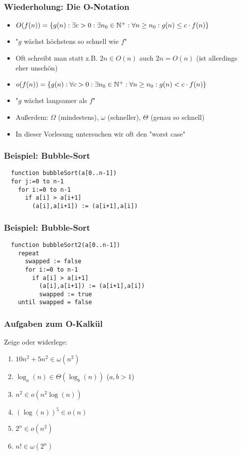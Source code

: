 \begin{frame}
\frametitle{Wiederholung: Die O-Notation}
\begin{itemize}
\item $O(f(n))=\{g(n):\exists c>0: \exists n_0\in\mathbb{N}^+: \forall n\geq n_0: g(n)\leq c\cdot f(n)\}$
\item "$g$ wächst höchstens so schnell wie $f$" \pause
\item Oft schreibt man statt z.B. $2n\in O(n)$ auch $2n=O(n)$ (ist allerdings eher unschön) \pause
\item $o(f(n))=\{g(n):\forall c>0: \exists n_0\in\mathbb{N}^+: \forall n\geq n_0: g(n)< c\cdot f(n)\}$
\item "$g$ wächst langsamer als $f$" \pause
\item Außerdem: $\Omega$ (mindestens), $\omega$ (schneller), $\Theta$ (genau so schnell) \pause
\item In dieser Vorlesung untersuchen wir oft den "worst case"
\end{itemize}
\end{frame}

\begin{frame}[fragile]
\frametitle{Beispiel: Bubble-Sort}
\begin{lstlisting}
  function bubbleSort(a[0..n-1])
  for j:=0 to n-1
    for i:=0 to n-1
      if a[i] > a[i+1]
        (a[i],a[i+1]) := (a[i+1],a[i]) 
\end{lstlisting}%
\end{frame}

\begin{frame}[fragile]
\frametitle{Beispiel: Bubble-Sort}
\begin{lstlisting}
  function bubbleSort2(a[0..n-1])
    repeat
      swapped := false
      for i:=0 to n-1
        if a[i] > a[i+1]
          (a[i],a[i+1]) := (a[i+1],a[i]) 
          swapped := true
    until swapped = false
\end{lstlisting}%
\end{frame}

\begin{frame}
\frametitle{Aufgaben zum O-Kalkül}
Zeige oder widerlege:
\begin{enumerate}
\item $10n^2 + 5n^2 \in \omega(n^2)$
\item $\log_a(n)\in\Theta(\log_b(n))$ ($a,b>1$)
\item $n^2 \in o(n^2 \log(n))$
\item $(\log(n))^5 \in o(n)$
\item $2^n \in o(n^2)$
\item $n! \in \omega(2^n)$
\end{enumerate}
\end{frame}


